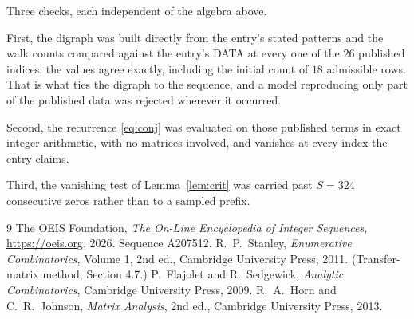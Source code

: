 \documentclass[11pt,a4paper]{article}
\theoremstyle{plain}
\theoremstyle{definition}
\begin{document}
Three checks, each independent of the algebra above.

First, the digraph was built directly from the entry's stated patterns and the walk counts
compared against the entry's DATA at every one of the $26$ published indices; the
values agree exactly, including the initial count of $18$ admissible rows. That is
what ties the digraph to the sequence, and a model reproducing only part of the published
data was rejected wherever it occurred.

Second, the recurrence \eqref{eq:conj} was evaluated on those published terms in exact
integer arithmetic, with no matrices involved, and vanishes at every index the entry claims.

Third, the vanishing test of Lemma~\ref{lem:crit} was carried past $S=324$ consecutive
zeros rather than to a sampled prefix.

\begin{thebibliography}{9}
 The OEIS Foundation, \emph{The On-Line Encyclopedia of Integer
Sequences}, \url{https://oeis.org}, 2026. Sequence A207512.
 R.~P.~Stanley, \emph{Enumerative Combinatorics}, Volume 1, 2nd ed.,
Cambridge University Press, 2011. (Transfer-matrix method, Section 4.7.)
 P.~Flajolet and R.~Sedgewick, \emph{Analytic Combinatorics}, Cambridge
University Press, 2009.
 R.~A.~Horn and C.~R.~Johnson, \emph{Matrix Analysis}, 2nd ed., Cambridge
University Press, 2013.
\end{thebibliography}
\end{document}
